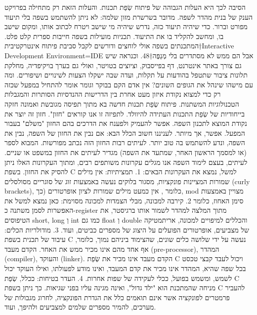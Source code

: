 \begin{ציינון}
      הסיבה לכך היא העלות הגבוהה של פיתוח שְׂפַת תכנות. והעלות הזאת רק מתחילה בפרויקט הענק של בנית מהדר לשפה. מדובר בשרשרת מזון שלמה: לא ניתן להשתמש בשפה בלי תיעוד מפורט וברור. כדי שיהיה תיעוד כזה, נדרש שיהיה מי שישב ויטרח לכתוב אותו, ומקום שישב בו, ומחשב להקליד בו את התיעוד. תכניות מועילות בשפה חייבות ספרית קלט פלט. המתכנתים בשפה אולי לוחצים ודורשים לקבל סביבת פיתוח אינטרקטיבית†{Interactive Development Environment=IDE} אבל הם ממש לא מסתדרים בלי מְנַפֶּה†{48}. וכנראה שיש גם צורך באתר אינטרנט, דף בפייסבוק, וציוצים בטויטר, ואולי גם בערך בויקיפדיה, מחלקת תלונות ציבור שתטפל בהודעות על תקלות, ועדה שבה ישקלו הצעות לשינויים ושיפורים. ומה עם מישהו שינהל את הגופים השונים?
      אין אדם הקם בבוקר וגומר אומר להתחיל במפעל שכזה רק כדי למצוא נקודת איזון מעט אחרת בין הדרישות ההנדסיות הסותרות והמגבלות הטכנולוגיות המשתנות.
      פיתוח שְׂפַת תכנות חדשה בא מתוך תפיסה מגובשת ואמונה חזקה בייחודיות של שְׂפַת התכנות העתידה להיוולד. לתפיזה זו אנו קוראים "חזון". חזון זה יוצר את נקודת המוצא לתכנון השפה. אפשר להעמיק ולפענח את הדרכים בהם החזון "משלם" בעבור המפעל. אפשר, אך מיותר. לעניננו חשוב הכלל הבא: אם נבין את החזון של השפה, נבין את השפה, ונדע להשתמש בה טוב יותר.
      לעיתים רבות החזון הזה נכתב מפורשות. המבוא לספר (או למסמך הראשון האחר, שמתעד את השפה) מגדיר לעיתים את החזון במשפט או שניים. לעיתים, בעצם לימוד השפה אנו מגלים עקרונות משותפים רבים, ומתוך העקרונות האלו ניתן להסיק את החזון.
      בשפת C למשל, נמצא את העקרונות הבאים:
      1. תמציתיות: אין מילים שמורות המציינות פונקציות, מסגור בלוקים נעשה באמצעות זוג של סוגריים מסולסלים (curly brackets), כלומר {}, אין כמעט מילים שמורות לציון אופרטורים (כך, mod מצויין באמצעות סימן האחוז, כלומר %
      2. קירבה למכונה, מבלי הצמדות למכונה מסוימת: כאן נמצא למשל את האפשרות לסמן משתנה כ-register מתוך המלצה למהדר לשמור אותו ברגיסטר, את הטיפוסים short, long וְ int כמו גם float וְ double והכללים למיפויים למכונה, אריתמטיקה של מצביעים, אופרטורים הפועלים על היצוג של מספרים כביטים, ועוד.
      3. מודולריות הכלים: עיבוד של תכנית בשפת C נעשה על ידי שלושה כלים שונים, שהצימוד ביניהם נמוך, כלומר, אף אחד מהם אינו מכיר ממש את האחר. הקדם מעבד (pre-processor), המהדר (compiler), והעוקד (linker). הקדם מעבד אינו מכיר את שְׂפַת C ויכול לעבד קבצי טכסט בכל שפה שהיא, המהדר אינו מכיר את קדם המעבד, ואינו מודע לפעולתו, ואילו העוקד יכול לשמש, ומשמש בפועל, ככלי לעקידה של שפות אחרות.
      4. העדר בטיחות: ככלל, שְׂפַת C מניחה שהמתכנת הוא "ילד גדול", ואינה מגינה עליו בפני שגיאות. כך ניתן בשפת C להעביר פרמטרים לפונקציה אשר אינם תואמים כלל את הגדרת הפונקציה, לחרוג מגבולות של מערכים, להמיר מספרים שלמים למצביעים ולהיפך, ועוד.

\end{ציינון}
